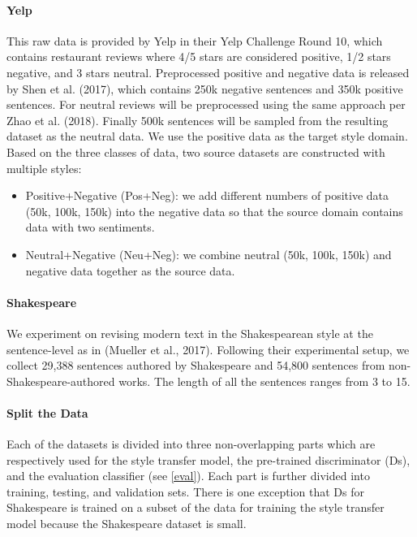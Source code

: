 \documentclass{article}
\begin{document}
\paragraph{Yelp}
This raw data is provided by Yelp in their Yelp Challenge Round 10, which contains restaurant reviews where 4/5 stars are considered positive, 1/2 stars negative, and 3 stars neutral. \newline
Preprocessed positive and negative data is released by Shen et al. (2017), which contains 250k negative sentences and 350k positive sentences.  \newline
For neutral reviews will be preprocessed using the same approach per Zhao et al. (2018). \newline
Finally 500k sentences will be sampled from the resulting dataset as the neutral data. We use the positive data as the target style domain. Based on the three classes of data, two source datasets are constructed with multiple styles:

\begin{itemize}
\item Positive+Negative (Pos+Neg): we add different numbers of positive data (50k, 100k, 150k) into
the negative data so that the source domain contains data with two sentiments.
\item Neutral+Negative (Neu+Neg): we combine neutral (50k, 100k, 150k) and negative data together as the source data.
\end{itemize}

\paragraph{Shakespeare}
We experiment on revising modern text in the Shakespearean style at the sentence-level as in (Mueller et al., 2017). Following their experimental setup, we collect 29,388 sentences authored by Shakespeare and 54,800 sentences from non-Shakespeare-authored works. The length of all the sentences ranges from 3 to 15. \newline

\paragraph{Split the Data}
Each of the datasets is divided into three non-overlapping parts which are respectively used for the style transfer model, the pre-trained discriminator (Ds), and the evaluation classifier (see \ref{eval}). Each part is further divided into training, testing, and validation sets. There is one exception that Ds for Shakespeare is trained on a subset of the data for training the style transfer model because the Shakespeare dataset is small. 
\end{document}
